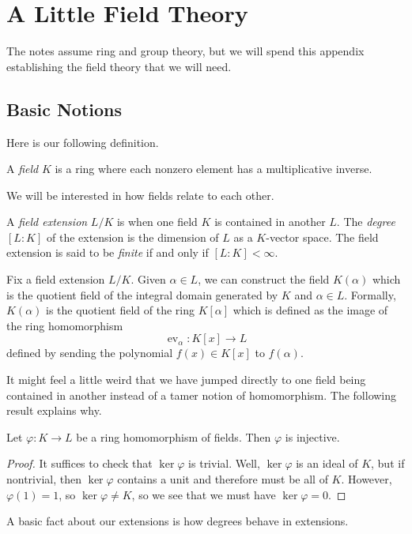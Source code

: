 \documentclass[../notes.tex]{subfiles}
\begin{document}
\section{A Little Field Theory} \label{app:fields}
The notes assume ring and group theory, but we will spend this appendix establishing the field theory that we will need.

\subsection{Basic Notions}
Here is our following definition.
\begin{definition}[field]
	A \textit{field} $K$ is a ring where each nonzero element has a multiplicative inverse.
\end{definition}
We will be interested in how fields relate to each other.
\begin{definition}
	A \textit{field extension} $L/K$ is when one field $K$ is contained in another $L$. The \textit{degree} $[L:K]$ of the extension is the dimension of $L$ as a $K$-vector space. The field extension is said to be \textit{finite} if and only if $[L:K]<\infty$.
\end{definition}
\begin{example}
	Fix a field extension $L/K$. Given $\alpha\in L$, we can construct the field $K(\alpha)$ which is the quotient field of the integral domain generated by $K$ and $\alpha\in L$. Formally, $K(\alpha)$ is the quotient field of the ring $K[\alpha]$ which is defined as the image of the ring homomorphism
	\[\operatorname{ev}_\alpha\colon K[x]\to L\]
	defined by sending the polynomial $f(x)\in K[x]$ to $f(\alpha)$.
\end{example}
It might feel a little weird that we have jumped directly to one field being contained in another instead of a tamer notion of homomorphism. The following result explains why.
\begin{lemma}
	Let $\varphi\colon K\to L$ be a ring homomorphism of fields. Then $\varphi$ is injective.
\end{lemma}
\begin{proof}
	It suffices to check that $\ker\varphi$ is trivial. Well, $\ker\varphi$ is an ideal of $K$, but if nontrivial, then $\ker\varphi$ contains a unit and therefore must be all of $K$. However, $\varphi(1)=1$, so $\ker\varphi\ne K$, so we see that we must have $\ker\varphi=0$.
\end{proof}
A basic fact about our extensions is how degrees behave in extensions.
\end{document}
